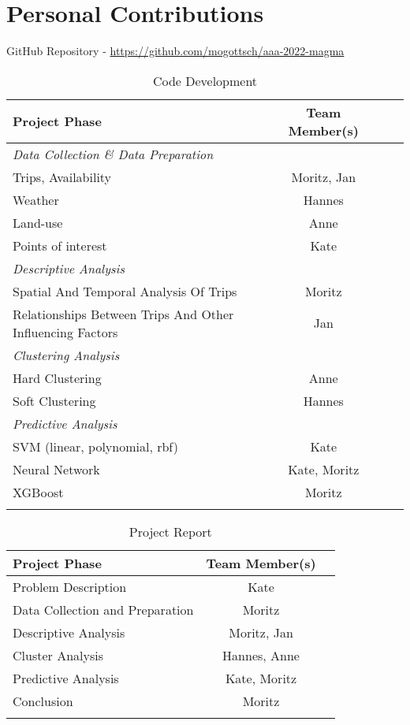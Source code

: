 \clearpage
\section{Personal Contributions}
\label{sec:personal_contributions}

GitHub Repository - \href{https://github.com/mogottsch/aaa-2022-magma}{https://github.com/mogottsch/aaa-2022-magma}

\begin{longtable}{|l|c|c|c|}
    \hline
    \textbf{Project Phase} & \textbf{Team Member(s)} \\
    \hline
    \multicolumn{4}{|l|}{\textit{Data Collection \& Data Preparation}} \\
    \hline
    Trips, Availability & Moritz, Jan \\
    \hline
    Weather & Hannes \\
    \hline
    Land-use & Anne \\
    \hline
    Points of interest & Kate \\
    \hline
    \multicolumn{4}{|l|}{\textit{Descriptive Analysis}} \\
    \hline
    Spatial And Temporal Analysis Of Trips & Moritz \\
    \hline
    Relationships Between Trips And Other Influencing Factors & Jan \\
    \hline
    \multicolumn{4}{|l|}{\textit{Clustering Analysis}} \\
    \hline
    Hard Clustering & Anne \\
    \hline
    Soft Clustering & Hannes \\
    \hline
    \multicolumn{4}{|l|}{\textit{Predictive Analysis}} \\
    \hline
    SVM (linear, polynomial, rbf) & Kate \\
    \hline
    Neural Network & Kate, Moritz  \\
    \hline
    XGBoost & Moritz  \\
    \hline

  \caption{Code Development}
  \label{table:code_development}
\end{longtable}



\begin{longtable}{|l|c|c|}
    \hline
    \textbf{Project Phase} & \textbf{Team Member(s)} \\
    \hline
    Problem Description & Kate \\
    \hline
    Data Collection and Preparation & Moritz \\
    \hline
    Descriptive Analysis & Moritz, Jan \\
    \hline
    Cluster Analysis & Hannes, Anne \\
    \hline
    Predictive Analysis & Kate, Moritz \\
    \hline
    Conclusion & Moritz \\
    \hline

  \caption{Project Report}
  \label{table:project_report}
\end{longtable}